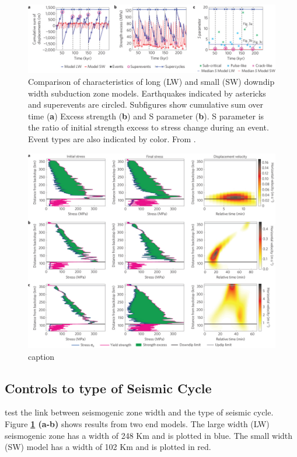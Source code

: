 \documentclass[draft,jgrga]{agutex}
\begin{document}
\begin{article}
\begin{figure}
	\includegraphics[width=1\linewidth]{Figures/Herrendorfer/ngeo2427-f2.jpeg}
	\caption{Comparison of characteristics of long (LW) and small (SW) downdip width subduction zone models. Earthquakes indicated by astericks and superevents are circled. Subfigures show cumulative sum over time ({\bf a}) Excess strength ({\bf b}) and S parameter ({\bf b}). S parameter is the ratio of initial strength excess to stress change during an event. Event types are also indicated by color. From \citet{Herrendorfer2015}.}
	\label{fig:SZOwidth}
\end{figure}
\begin{figure}
	\includegraphics[width=1\linewidth]{Figures/Herrendorfer/ngeo2427-f3.jpeg}
	\caption{caption}
	\label{fig:ruptureStyle}
\end{figure}

\subsection{Controls to type of Seismic Cycle}
\citet{Herrendorfer2015} test the link between seismogenic zone width and the type of seismic cycle. Figure {\bf \ref{fig:SZOwidth} (a-b)} shows results from two end models. The large width (LW) seismogenic zone has a width of 248 Km and is plotted in blue. The small width (SW) model has a width of 102 Km and is plotted in red. 


\end{article}
\end{document}
